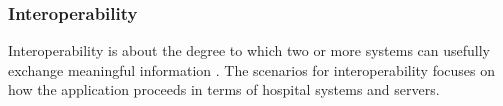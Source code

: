 \subsubsection{Interoperability}
\label{modularityQA}
Interoperability is about the degree to which two or more systems can usefully exchange meaningful information \cite{softwarearchitecture}. The scenarios for interoperability focuses on how the application proceeds in terms of hospital systems and servers.

